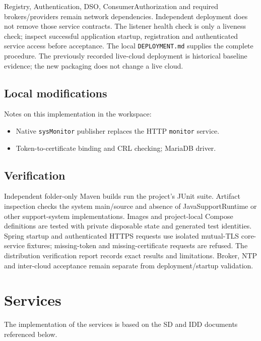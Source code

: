 \documentclass[a4paper]{arrowhead}
\begin{document}
Registry, Authentication, DSO, ConsumerAuthorization and required brokers/providers remain network dependencies. Independent deployment does not remove those service contracts. The listener health check is only a liveness check; inspect successful application startup, registration and authenticated service access before acceptance. The local \texttt{DEPLOYMENT.md} supplies the complete procedure. The previously recorded live-cloud deployment is historical baseline evidence; the new packaging does not change a live cloud.

\subsection{Local modifications}
\label{sec:local}

Notes on this implementation in the workspace:
\begin{itemize}
  \item Native \texttt{sysMonitor} publisher replaces the HTTP \texttt{monitor} service.
  \item Token-to-certificate binding and CRL checking; MariaDB driver.
\end{itemize}

\subsection{Verification}

Independent folder-only Maven builds run the project's JUnit suite. Artifact inspection checks the system main/source and absence of JavaSupportRuntime or other support-system implementations. Images and project-local Compose definitions are tested with private disposable state and generated test identities. Spring startup and authenticated HTTPS requests use isolated mutual-TLS core-service fixtures; missing-token and missing-certificate requests are refused. The distribution verification report records exact results and limitations. Broker, NTP and inter-cloud acceptance remain separate from deployment/startup validation.

\newpage

\section{Services}
\label{sec:services}

The implementation of the services is based on the SD and IDD documents referenced below.
\end{document}
